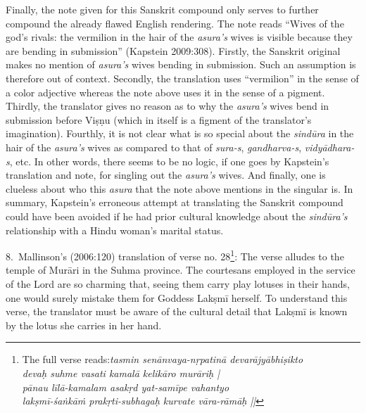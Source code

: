 Finally, the note given for this Sanskrit compound only serves to further compound the already flawed English rendering. The note reads “Wives of the god’s rivals: the vermilion in the hair of the \textsl{asura’s }wives is visible because they are bending in submission” (Kapstein 2009:308). Firstly, the Sanskrit original makes no mention of \textsl{asura’s} wives bending in submission. Such an assumption is therefore out of context. Secondly, the translation uses “vermilion” in the sense of a color adjective whereas the note above uses it in the sense of a pigment. Thirdly, the translator gives no reason as to why the \textsl{asura’s} wives bend in submission before Viṣṇu (which in itself is a figment of the translator’s imagination). Fourthly, it is not clear what is so special about the \textsl{sindūra} in the hair of the \textsl{asura’s} wives as compared to that of \textsl{sura-s}, \textsl{gandharva-s}, \textsl{vidyādhara-s}, etc. In other words, there seems to be no logic, if one goes by Kapstein’s translation and note, for singling out the \textsl{asura’s} wives. And finally, one is clueless about who this \textsl{asura} that the note above mentions in the singular is. In summary, Kapstein’s erroneous attempt at translating the Sanskrit compound could have been avoided if he had prior cultural knowledge about the \textsl{sindūra’s} relationship with a Hindu woman’s marital status.

8.~Mallinson’s (2006:120) translation of verse no. 28\footnote[5]{The full verse reads:\textsl{tasmin senānvaya-nṛpatinā devarājyābhiṣikto}\\
\textsl{devaḥ suhme vasati kamalā kelikāro murāriḥ |}\\
\textsl{pānau līlā-kamalam asakṛd yat-samīpe vahantyo}\\
\textsl{lakṣmī-śaṅkāṁ prakṛti-subhagaḥ kurvate vāra-rāmāḥ ||}}: The verse alludes to the temple of Murāri in the Suhma province. The courtesans employed in the service of the Lord are so charming that, seeing them carry play lotuses in their hands, one would surely mistake them for Goddess Lakṣmī herself. To understand this verse, the translator must be aware of the cultural detail that Lakṣmī is known by the lotus she carries in her hand. 


